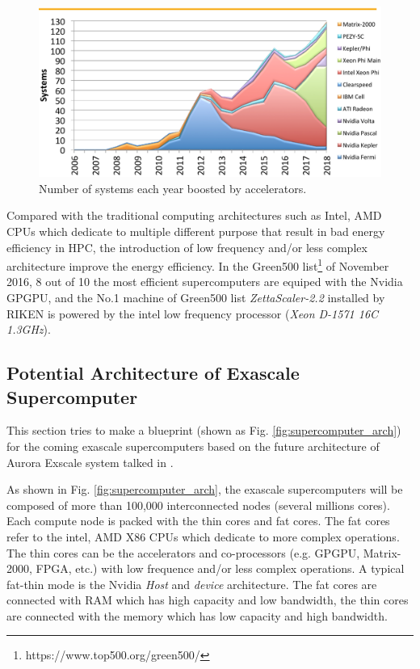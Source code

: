 \begin{figure}[t]
	\centering
	\includegraphics[width=6.3in]{fig/top500.pdf}
	\caption{Number of systems each year boosted by accelerators.}
	\label{top500-acc}
\end{figure}


Compared with the traditional computing architectures such as Intel, AMD CPUs which dedicate to multiple different purpose that result in bad energy efficiency in HPC, the introduction of low frequency and/or less complex architecture improve the energy efficiency. In the Green500 list\footnote{https://www.top500.org/green500/} of November 2016, 8 out of 10 the most efficient supercomputers are equiped with the Nvidia GPGPU, and the No.1 machine of Green500 list \textit{ZettaScaler-2.2} installed by RIKEN is powered by the intel low frequency processor (\textit{Xeon D-1571 16C 1.3GHz}).

\subsection{Potential Architecture of Exascale Supercomputer} \label{Potential Architecture of Exascale Supercomputer}

This section tries to make a blueprint (shown as Fig. \ref{fig:supercomputer_arch}) for the coming exascale supercomputers based on the future architecture of Aurora Exscale system talked in \cite{TheNextPlatform}.

As shown in Fig. \ref{fig:supercomputer_arch}, the exascale supercomputers will be composed of more than 100,000 interconnected nodes (several millions cores). Each compute node is packed with the thin cores and fat cores. The fat cores refer to the intel, AMD X86 CPUs which dedicate to more complex operations. The thin cores can be the accelerators and co-processors (e.g. GPGPU, Matrix-2000, FPGA, etc.) with low frequence and/or less complex operations. A typical fat-thin mode is the Nvidia \textit{Host} and \textit{device} architecture. The fat cores are connected with RAM which has high capacity and low bandwidth, the thin cores are connected with the memory which has low capacity and high bandwidth.

